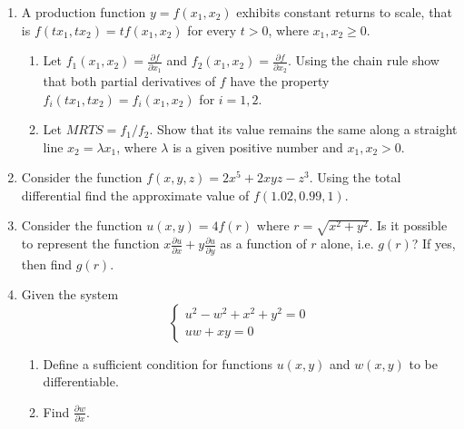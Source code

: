 \begin{enumerate}
\item A production function $y=f(x_1, x_2)$ exhibits constant returns to scale, 
that is $f(tx_1,tx_2)=tf(x_1,x_2)$ for every $t>0$, where $x_1, x_2 \geq 0$.
\begin{enumerate}
\item Let $f_1(x_1,x_2)=\frac{\partial f}{\partial x_1}$ and $f_2(x_1,x_2)=\frac{\partial f}{\partial x_2}$. 
Using the chain rule show that both partial derivatives of $f$ have the property $f_i(tx_1,tx_2)=f_i(x_1,x_2)$ for $i=1,2$.
\item Let $MRTS=f_1/f_2$. Show that its value remains the same along a straight line $x_2=\lambda x_1$,
 where $\lambda$ is a given positive number and $x_1, x_2>0$.
\end{enumerate}

\item Consider the function $f(x,y,z)=2x^5+2xyz-z^3$. 
Using the total differential find the approximate value of $f(1.02,0.99,1)$.

\item Consider the function $u(x,y)=4f(r)$ where $r=\sqrt{x^2+y^2}$. 
Is it possible to represent the function $x\frac{\partial u}{\partial x}+y\frac{\partial u}{\partial y}$ as a function of $r$ alone, i.e. $g(r)$? If yes, then find $g(r)$.

\item Given the system
\begin{equation} \nonumber
\begin{cases}
u^2-w^2+x^2+y^2=0 \\
uw+xy=0
\end{cases}
\end{equation}
\begin{enumerate}
\item Define a sufficient condition for functions $u(x,y)$ and $w(x,y)$ to be differentiable.
\item Find $\frac{\partial w}{\partial x}$.
\end{enumerate}

\end{enumerate}


